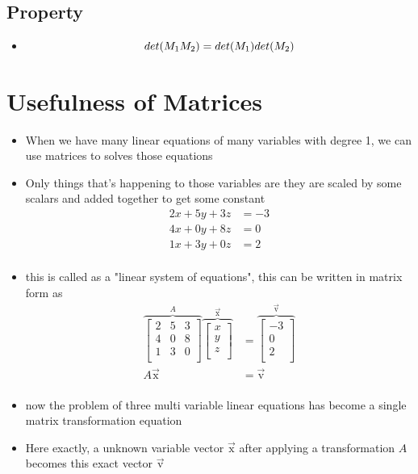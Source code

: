 \documentclass[a4paper]{article}
\begin{document}
\subsection{Property}
\begin{itemize}
	\item \[
		      det(M_1 M_2) = det(M_1) det(M_2) \\
	      \]
\end{itemize}

\newpage
\section{Usefulness of Matrices}
\begin{itemize}
	\item When we have many linear equations of many variables with degree 1,
	      we can use matrices to solves those equations
	\item  Only things that's happening to those variables are they are
	      scaled by some scalars and added together to get some constant
	      \begin{align*}
		      2x + 5y + 3z & = -3 \\
		      4x + 0y + 8z & = 0  \\
		      1x + 3y + 0z & = 2  \\
	      \end{align*}
	\item this is called as a "linear system of equations", this can be
	      written in matrix form as
	      \begin{align*}
		      \overbrace{
			      \begin{bmatrix}
				      2 & 5 & 3 \\
				      4 & 0 & 8 \\
				      1 & 3 & 0 \\\end{bmatrix}
		      }^{A}
		      \overbrace{
			      \begin{bmatrix}
				      x \\ y \\ z \\ \end{bmatrix}
		      }^{\vec{\text{x}}}
		       & = \overbrace{
			      \begin{bmatrix}
				      -3 \\ 0  \\ 2 \\ \end{bmatrix}
		      }^{\vec{\text{v}}}  \\
		      A \vec{\text{x}}
		       & = \vec{\text{v}} \\
	      \end{align*}
	\item now the problem of three multi variable linear equations
	      has become a single matrix transformation equation
	\item Here exactly, a unknown variable vector $\vec{\text{x}}$
	      after applying a transformation $A$ becomes this exact
	      vector $\vec{\text{v}}$
\end{itemize}
\end{document}
